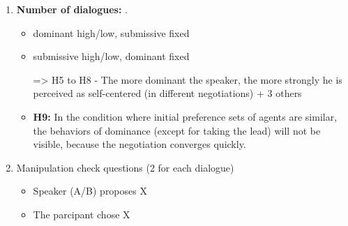 \documentclass{article}
\begin{document}
\begin{enumerate}
		
		\item \textbf{Number of dialogues:} .
		\begin{itemize}
				\item dominant high/low, submissive fixed
				\item submissive high/low, dominant fixed
				
				=> H5 to H8 - The more dominant the speaker, the more strongly he is perceived as self-centered (in different negotiations) + 3 others
				
				\item \textbf{H9:} In the condition where initial preference sets of agents are similar, the behaviors of dominance (except for taking the lead) will not be visible, because the negotiation converges quickly.
		\end{itemize}
		

		
		\item Manipulation check questions (2 for each dialogue)
		\begin{itemize}
			\item Speaker (A/B) proposes X
			\item The parcipant chose X 
		\end{itemize}
		
	\end{enumerate}
	
	
\end{document}
